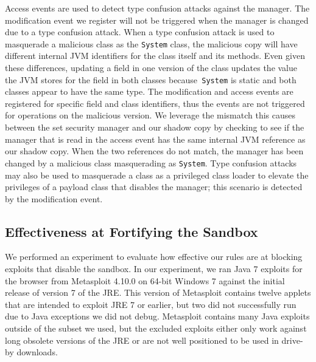 \documentclass{sig-alternate}
\begin{document}
Access events are used to detect type confusion attacks against the
manager. The modification event we register will not be triggered
when the manager is changed due to a type confusion attack. When a
type confusion attack is used to masquerade a malicious class as the
\texttt{System} class, the malicious copy will have different internal
JVM identifiers for the class itself and its methods. Even given these
differences, updating a field in one version of the class updates
the value the JVM stores for the field in both classes because\texttt{
System} is static and both classes appear to have the same type. The
modification and access events are registered for specific field and
class identifiers, thus the events are not triggered for operations
on the malicious version. We leverage the mismatch this causes between
the set security manager and our shadow copy by checking to see if
the manager that is read in the access event has the same internal
JVM reference as our shadow copy. When the two references do not match,
the manager has been changed by a malicious class masquerading as
\texttt{System}. Type confusion attacks may also be used to masquerade
a class as a privileged class loader to elevate the privileges of
a payload class that disables the manager; this scenario is detected
by the modification event.


\subsection{Effectiveness at Fortifying the Sandbox}\label{sub:Effectiveness-at-Fortifying}


We performed an experiment to evaluate how effective our rules are
at blocking exploits that disable the sandbox. In our experiment,
we ran Java 7 exploits for the browser from Metasploit 4.10.0 on 64-bit
Windows 7 against the initial release of version 7 of the JRE. This
version of Metasploit contains twelve applets that are intended to
exploit JRE 7 or earlier, but two did not successfully run due to
Java exceptions we did not debug. Metasploit contains many Java exploits
outside of the subset we used, but the excluded exploits either only
work against long obsolete versions of the JRE or are not well positioned
to be used in drive-by downloads. 
\end{document}
